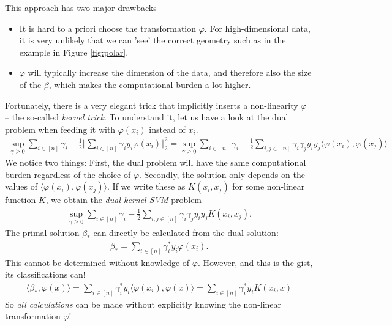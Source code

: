 \documentclass{article}
\newcommand{\sprod}[1]{\langle #1 \rangle}
\newcommand{\norm}[1]{\Vert #1 \Vert}
\begin{document}
This approach has two major drawbacks
\begin{itemize}
    \item It is hard to a priori choose the transformation $\varphi$. For high-dimensional data, it is very unlikely that we can 'see' the correct geometry such as in the example in Figure  \ref{fig:polar}.
    \item $\varphi$ will typically increase the dimension of the data, and therefore also the size of the $\beta$, which makes the computational burden a lot higher.
\end{itemize}
Fortunately, there is a very elegant trick that implicitly inserts a non-linearity $\varphi$ -- the so-called \emph{kernel trick}. To understand it, let us have a look at the dual problem when feeding it with $\varphi(x_i)$ instead of $x_i$.
\begin{align*}
        \sup_{\gamma \geq 0} \sum_{i \in [n]}\gamma_i -\tfrac{1}{2} \norm{\sum_{i\in [n]}\gamma_i y_i \varphi(x_i)}_2^2 = \sup_{\gamma \geq 0 }  \sum_{i \in [n]}\gamma_i -\tfrac{1}{2} \sum_{i,j\in [n]}\gamma_i\gamma_j y_iy_j \sprod{\varphi(x_i),\varphi(x_j)}
    \end{align*}
    We notice two things: First, the dual problem will have the same computational burden regardless of the choice of $\varphi$. Secondly, the solution only depends on the values of $\sprod{\varphi(x_i),\varphi(x_j)}$. If we write these as $K(x_i,x_j)$ for some non-linear function $K$, we obtain the \emph{dual kernel SVM} problem
    \begin{align}
        \sup_{\gamma \geq 0 }  \sum_{i \in [n]}\gamma_i -\tfrac{1}{2} \sum_{i,j\in [n]}\gamma_i\gamma_j y_iy_j K(x_i,x_j). \label{eq:kernelsvm}
    \end{align}
    The primal solution $\beta_*$ can directly be calculated from the dual solution:
    \begin{align*}
        \beta_* = \sum_{i \in [n]} \gamma_i^*y_i \varphi(x_i).
    \end{align*}
    This cannot be determined without knowledge of $\varphi$. However, and this is the gist, its classifications can!
    \begin{align}
        \sprod{\beta_*,\varphi(x)} =\sum_{i \in [n]} \gamma_i^*y_i \sprod{\varphi(x_i),\varphi(x)} =  \sum_{i \in [n]} \gamma_i^*y_i K(x_i,x) \label{eq:kernelclass}
    \end{align}
So \emph{all calculations} can be made without explicitly knowing the non-linear transformation $\varphi$!
\end{document}
